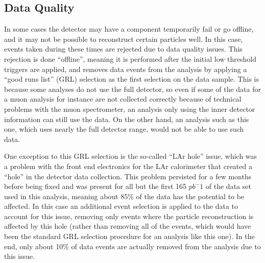 \subsection{Data Quality}\label{sec:dataquality}
In some cases the detector may have a component temporarily fail or go offline, and it may not be possible to reconstruct certain particles well.  In this case, events taken during these times are rejected due to data quality issues.  This rejection is done ``offline'', meaning it is performed after the initial low threshold triggers are applied, and removes data events from the analysis by applying a ``good runs list'' (GRL) selection as the first selection on the data sample.  This is because some analyses do not use the full detector, so even if some of the data for a muon analysis for instance are not collected correctly because of technical problems with the muon spectrometer, an analysis only using the inner detector information can still use the data.  On the other hand, an analysis such as this one, which uses nearly the full detector range, would not be able to use such data.

One exception to this GRL selection is the so-called ``LAr hole'' issue, which was a problem with the front end electronics for the LAr calorimeter that created a ``hole'' in the detector data collection.  This problem persisted for a few months before being fixed and was present for all but the first 165 $pb^-1$ of the data set used in this analysis, meaning about 85\% of the data has the potential to be affected.  In this case an additional event selection is applied to the data to account for this issue, removing only events where the particle reconstruction is affected by this hole (rather than removing all of the events, which would have been the standard GRL selection procedure for an analysis like this one).  In the end, only about 10\% of data events are actually removed from the analysis due to this issue.
